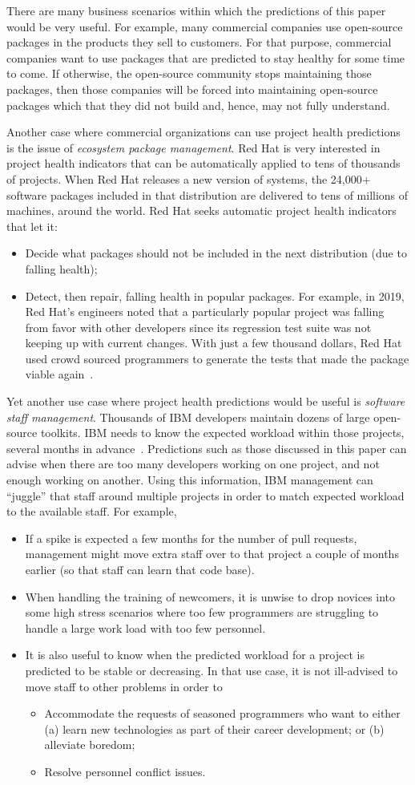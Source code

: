 \documentclass[sigconf,anonymous,review]{acmart}
\newcommand{\bi}{\begin{itemize}}
\newcommand{\ei}{\end{itemize}}
\begin{document}
 
 There are many business scenarios within which the predictions of this paper would be very useful.
For example,
many commercial companies   use open-source packages in the products they sell to customers. For that purpose,
commercial companies want to use packages that are predicted to stay healthy for some time to come. If otherwise, the open-source community stops maintaining those
packages,
then those companies
will be forced into maintaining open-source packages which that they did not build and, hence,   may not fully understand.

Another case where commercial organizations can use project health predictions is the issue
of {\em ecosystem package management}.
Red Hat  is very interested in project health indicators that can be automatically applied to tens of thousands of projects. 
 When Red Hat releases a new version of systems, the  24,000+ software packages included in that distribution are   delivered to tens of millions of machines, around the world.  Red Hat seeks automatic project health indicators that let it:
\bi
\item Decide what packages should not be included in the next distribution (due to falling health);
\item Detect, then repair, falling health in   popular packages.
For example, in 2019, Red Hat's engineers
noted that a particularly popular  project was falling from favor with other developers since its regression test suite was not keeping up with current changes. With just a few thousand dollars, Red Hat used crowd sourced programmers
to generate the tests that made the package viable again~\cite{stewart19}.
\ei
Yet another use case where project health predictions would be useful is {\em software staff management}.
  Thousands of IBM developers maintain dozens of    large open-source toolkits. 
 IBM needs to know the expected workload within those projects, several months in advance~\cite{krishna2018connection}.
 Predictions such as those discussed in this paper can advise when  there are too many developers working on one project, and not enough working on another.
Using this information,
 IBM management  can    ``juggle'' that staff around multiple  projects in order to match   expected workload to the available staff. 
 For example, 
 \bi
 \item
 If a spike is expected a few months for the number of pull
 requests,    management might move extra staff over to that project a couple of months earlier (so that staff can learn that code base). 
 \item When handling  the training of newcomers, it is unwise to drop novices into some high stress scenarios where too few programmers are struggling to handle a large work load with too few personnel.
 \item It is also useful to know when the predicted workload for a project is predicted to be stable or decreasing. In that use case, it is not ill-advised to move staff to other problems in order to 
 \bi
 \item
 Accommodate the requests of seasoned programmers who want to either (a) learn new technologies as part of their career development; or (b)
 alleviate boredom;
 \item Resolve personnel conflict issues.
 \ei
 \ei
\end{document}
